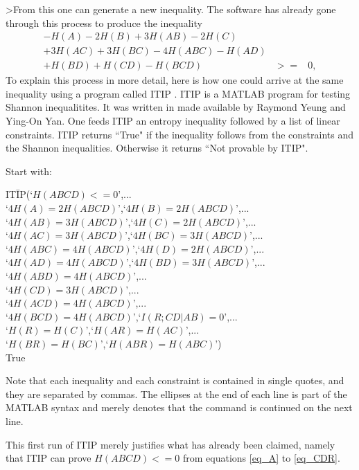 \documentclass[10pt,journal]{IEEEtran}
\begin{document}
>From this one can generate a new inequality.  The software has already gone
through this process to produce the inequality
\begin{eqnarray*}
   -H(A)-2H(B)+3H(AB)-2H(C)&&\\
   +3H(AC)+3H(BC)-4H(ABC)-H(AD)&&\\
   +H(BD)+H(CD)-H(BCD) &>=& 0,
\end{eqnarray*}
To explain this process in more detail, here is how one could
arrive at the same inequality using a program called ITIP \cite{ITIP}.
ITIP is a MATLAB \cite{MATLAB} program for testing Shannon inequalitites.  It was written
in made available by Raymond Yeung and Ying-On Yan.
One feeds ITIP an entropy inequality followed by a list of linear constraints.
ITIP returns ``True" if the inequality follows from the constraints and the
Shannon inequalities. Otherwise it returns ``Not provable by ITIP".

Start with:
\begin{tabbing}
IT\=IP(`$H(ABCD)<=0$',...\\
    \>`$4H(A)=2H(ABCD)$',`$4H(B)=2H(ABCD)$',...\\
    \> `$4H(AB)=3H(ABCD)$',`$4H(C)=2H(ABCD)$',...\\
    \>`$4H(AC)=3H(ABCD)$',`$4H(BC)=3H(ABCD)$',...\\
      \>`$4H(ABC)=4H(ABCD)$',`$4H(D)=2H(ABCD)$',...\\
      \>`$4H(AD)=4H(ABCD)$',`$4H(BD)=3H(ABCD)$',...\\
      \>`$4H(ABD)=4H(ABCD)$',...\\
      \>`$4H(CD)=3H(ABCD)$',...\\
      \>`$4H(ACD)=4H(ABCD)$',...\\
      \>`$4H(BCD)=4H(ABCD)$',`$I(R;CD|AB)=0$',...\\
      \>`$H(R)=H(C)$',`$H(AR)=H(AC)$',...\\
      \>`$H(BR)=H(BC)$',`$H(ABR)=H(ABC)$')\\
   True
\end{tabbing}

Note that each inequality and each constraint is contained in single quotes, and
they are separated by commas.  The ellipses at the end of each line is part of the
MATLAB syntax and merely denotes that the command is continued on the next line.

This first run of ITIP merely justifies what has already been claimed, namely
that ITIP can prove $H(ABCD)<=0$ from equations \eqref{eq_A} to
\eqref{eq_CDR}.
\end{document}
